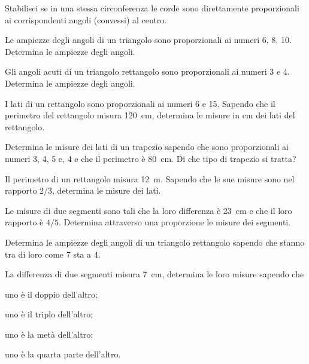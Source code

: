 \begin{multicols}{2}
\begin{esercizio}
\label{ese:6.20}
Stabilisci se in una stessa circonferenza le corde sono direttamente 
proporzionali ai corrispondenti angoli (convessi) al centro.
\end{esercizio}

\begin{esercizio}
\label{ese:6.21}
Le ampiezze degli angoli di un triangolo sono proporzionali ai numeri 
6, 8, 10. Determina le ampiezze degli angoli.
\end{esercizio}

\begin{esercizio}
\label{ese:6.22}
Gli angoli acuti di un triangolo rettangolo sono proporzionali ai 
numeri 3 e 4. Determina le ampiezze degli angoli.
\end{esercizio}

\begin{esercizio}
\label{ese:6.23}
I lati di un rettangolo sono proporzionali ai numeri 6 e 15. Sapendo 
che il perimetro del rettangolo misura 120~cm, determina le misure in 
cm dei lati del rettangolo.
\end{esercizio}

\begin{esercizio}
\label{ese:6.24}
Determina le misure dei lati di un trapezio sapendo che sono 
proporzionali ai numeri 3, 4, 5 e, 4 e che il perimetro è 80~cm. Di 
che tipo di trapezio si tratta?
\end{esercizio}

\begin{esercizio}
\label{ese:6.25}
Il perimetro di un rettangolo misura 12~m. Sapendo che le sue misure 
sono nel rapporto \(2/3\), determina le misure dei lati.
\end{esercizio}

\begin{esercizio}
\label{ese:6.26}
Le misure di due segmenti sono tali che la loro differenza è 23~cm e 
che il loro rapporto è \(4/5\). Determina attraverso una proporzione le 
misure dei segmenti. 
\end{esercizio}

\begin{esercizio}
\label{ese:6.27}
Determina le ampiezze degli angoli di un triangolo rettangolo sapendo 
che stanno tra di loro come 7 sta a 4.
\end{esercizio}

\begin{esercizio}
\label{ese:6.28}
La differenza di due segmenti misura 7~cm, determina le loro misure 
sapendo che
\begin{enumeratea}
\item uno è il doppio dell'altro;
\item uno è il triplo dell'altro;
\item uno è la metà dell'altro;
\item uno è la quarta parte dell'altro.
\end{enumeratea}
\end{esercizio}


\end{multicols}
